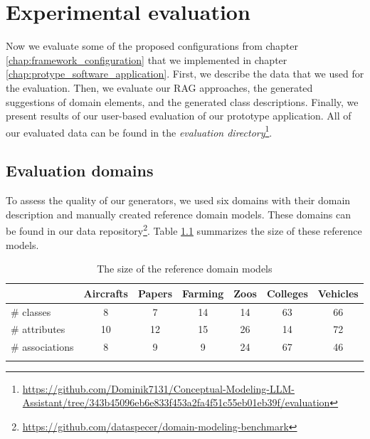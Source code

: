 \chapter{Experimental evaluation}
\label{chap:evaluation}

Now we evaluate some of the proposed configurations from chapter \ref{chap:framework_configuration} that we implemented in chapter \ref{chap:protype_software_application}. First, we describe the data that we used for the evaluation. Then, we evaluate our RAG approaches, the generated suggestions of domain elements, and the generated class descriptions. Finally, we present results of our user-based evaluation of our prototype application. All of our evaluated data can be found in the \textit{evaluation directory}\footnote{\url{https://github.com/Dominik7131/Conceptual-Modeling-LLM-Assistant/tree/343b45096eb6e833f453a2fa4f51c55eb01eb39f/evaluation}}.


\section{Evaluation domains}

To assess the quality of our generators, we used six domains with their domain description and manually created reference domain models. These domains can be found in our data repository\footnote{\url{https://github.com/dataspecer/domain-modeling-benchmark}}. Table \ref{tab:reference-model-size} summarizes the size of these reference models.

\begin{table}[!h]
    \scriptsize
    \centering
    \setlength{\tabcolsep}{0.5em}
    \begin{tabular}{lcccccc}
         & Aircrafts & Papers & Farming & Zoos & Colleges & Vehicles \\
    \toprule
    \addlinespace
         \# classes      & 8  & 7  & 14 & 14 & 63 & 66 \\
         \# attributes   & 10 & 12 & 15 & 26 & 14 & 72 \\
         \# associations & 8  & 9  & 9  & 24 & 67 & 46 \\
    \addlinespace
    \bottomrule
    \addlinespace
    \end{tabular}
    \caption{The size of the reference domain models}
    \label{tab:reference-model-size}
\end{table}


